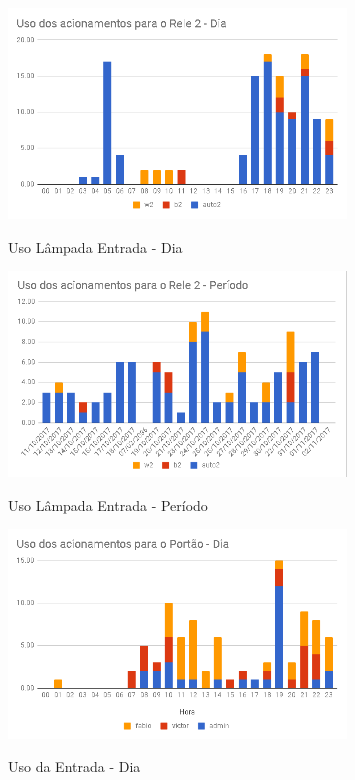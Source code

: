 \begin{figure}[H]
	\centering
	\caption{Uso Lâmpada Entrada - Dia}
	\includegraphics[width=0.8\textwidth]{usoLampadaEntradaDia}
	\label{fig:usoLampadaEntradaDia}
\end{figure}

\begin{figure}[H]
	\centering
	\caption{Uso Lâmpada Entrada - Período}
	\includegraphics[width=0.8\textwidth]{UsoLampadaEntradaPeriodo}
	\label{fig:UsoLampadaEntradaPeriodo}
\end{figure}

\begin{figure}[H]
	\centering
	\caption{Uso da Entrada - Dia}
	\includegraphics[width=0.8\textwidth]{usoacessodia}
	\label{fig:usoacessodia}
\end{figure}

